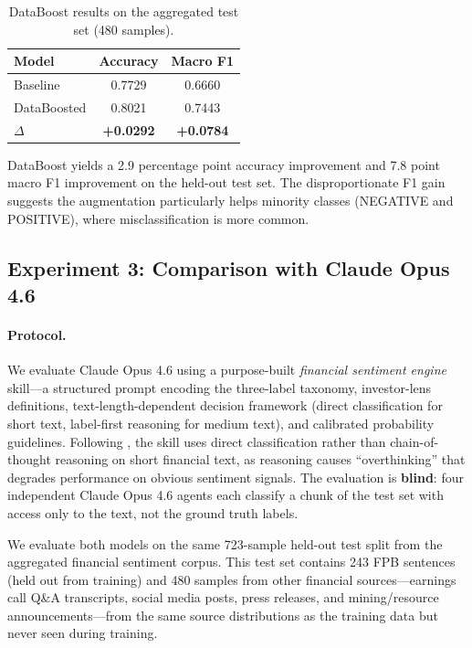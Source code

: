 \documentclass[11pt]{article}
\begin{document}
\begin{table}[h]
\centering
\caption{DataBoost results on the aggregated test set (480 samples).}
\label{tab:databoost}
\begin{tabular}{lcc}
\toprule
\textbf{Model} & \textbf{Accuracy} & \textbf{Macro F1} \\
\midrule
Baseline & 0.7729 & 0.6660 \\
DataBoosted & 0.8021 & 0.7443 \\
\midrule
$\Delta$ & \textbf{+0.0292} & \textbf{+0.0784} \\
\bottomrule
\end{tabular}
\end{table}

DataBoost yields a 2.9 percentage point accuracy improvement and 7.8 point macro F1 improvement on the held-out test set. The disproportionate F1 gain suggests the augmentation particularly helps minority classes (NEGATIVE and POSITIVE), where misclassification is more common.

\subsection{Experiment 3: Comparison with Claude Opus 4.6}
\label{sec:claude}

\paragraph{Protocol.}
We evaluate Claude Opus 4.6 using a purpose-built \emph{financial sentiment engine} skill---a structured prompt encoding the three-label taxonomy, investor-lens definitions, text-length-dependent decision framework (direct classification for short text, label-first reasoning for medium text), and calibrated probability guidelines. Following \citet{vamvourellis2025overthinking}, the skill uses direct classification rather than chain-of-thought reasoning on short financial text, as reasoning causes ``overthinking'' that degrades performance on obvious sentiment signals. The evaluation is \textbf{blind}: four independent Claude Opus 4.6 agents each classify a chunk of the test set with access only to the text, not the ground truth labels.

We evaluate both models on the same 723-sample held-out test split from the aggregated financial sentiment corpus. This test set contains 243 FPB sentences (held out from training) and 480 samples from other financial sources---earnings call Q\&A transcripts, social media posts, press releases, and mining/resource announcements---from the same source distributions as the training data but never seen during training.
\end{document}
